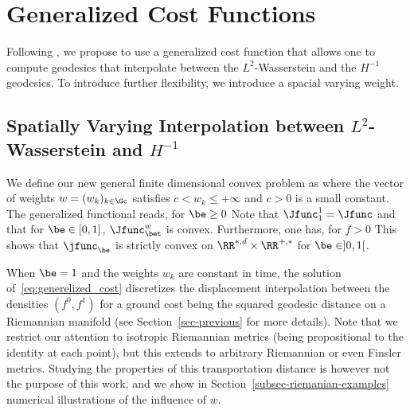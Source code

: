 \section{Generalized Cost Functions}


Following \cite{dolbeault2009,Cardaliaguet2012}, we propose to use a generalized cost function that allows one to compute geodesics that interpolate between the $L^2$-Wasserstein and the $H^{-1}$ geodesics. To introduce further flexibility, we introduce a spacial varying weight.



\subsection{Spatially Varying Interpolation between $L^2$-Wasserstein and $H^{-1}$ }\label{sec:generalized_cost}


We define our new general finite dimensional convex problem as
where the vector of weights $w = (w_k)_{k \in \Gc}$ satisfies $c < w_k \leq +\infty$ and  $c>0$ is a small constant. 
The generalized functional   reads, for $\be \geq 0 $
Note that $\Jfunc_1^1 = \Jfunc$ and that for $\be \in [0,1]$, $\Jfunc_\bet^w$ is convex. 
Furthermore, one has, for $f>0$  
This shows that $\jfunc_\be$ is strictly convex on $\RR^{*,d} \times \RR^{+,*}$ for $\be \in ]0,1[$.

When $\be=1$ and the weights $w_k$ are constant in time, the solution of~\eqref{eq:generelized_cost} discretizes the displacement interpolation between the densities $(f^0,f^1)$ for a ground cost being the squared geodesic distance on a Riemannian manifold (see Section~\ref{sec-previous} for more details). Note that we restrict our attention to isotropic Riemannian metrics (being propositional to the identity at each point), but this extends to arbitrary Riemannian or even Finsler metrics.  Studying the properties of this transportation distance is however not the purpose of this work, and we show in Section~\ref{subsec-riemanian-examples} numerical illustrations of the influence of $w$. 


